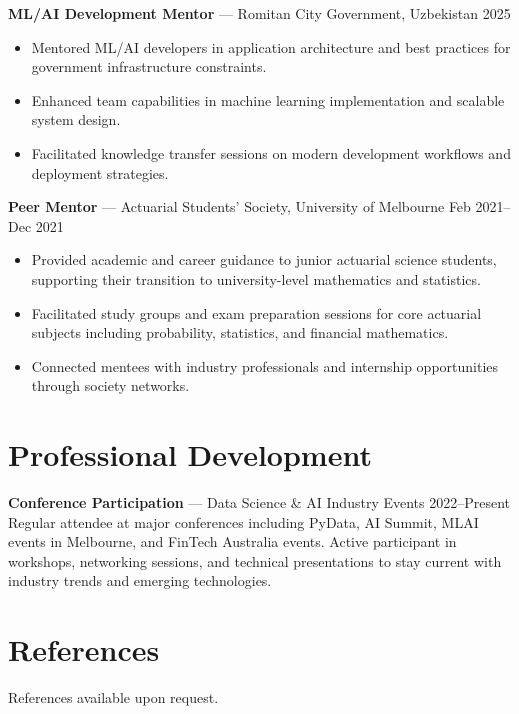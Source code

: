 \documentclass[10pt,letterpaper]{article}
\begin{document}
\textbf{ML/AI Development Mentor} — Romitan City Government, Uzbekistan \hfill 2025\\[-1.5em]
\begin{itemize}
  \item Mentored ML/AI developers in application architecture and best practices for government infrastructure constraints.
  \item Enhanced team capabilities in machine learning implementation and scalable system design.
  \item Facilitated knowledge transfer sessions on modern development workflows and deployment strategies.
\end{itemize}

\textbf{Peer Mentor} — Actuarial Students' Society, University of Melbourne \hfill Feb 2021--Dec 2021\\[-1.5em]
\begin{itemize}
  \item Provided academic and career guidance to junior actuarial science students, supporting their transition to university-level mathematics and statistics.
  \item Facilitated study groups and exam preparation sessions for core actuarial subjects including probability, statistics, and financial mathematics.
  \item Connected mentees with industry professionals and internship opportunities through society networks.
\end{itemize}

\section*{Professional Development}

\textbf{Conference Participation} — Data Science \& AI Industry Events \hfill 2022--Present\\
Regular attendee at major conferences including PyData, AI Summit, MLAI events in Melbourne, and FinTech Australia events. Active participant in workshops, networking sessions, and technical presentations to stay current with industry trends and emerging technologies.

\section*{References}

References available upon request.
\end{document}
